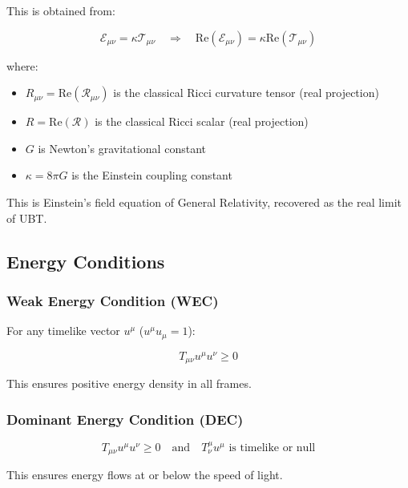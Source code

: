 This is obtained from:

\begin{equation}
\mathcal{E}_{\mu\nu} = \kappa \mathcal{T}_{\mu\nu} \quad \Rightarrow \quad \text{Re}(\mathcal{E}_{\mu\nu}) = \kappa \text{Re}(\mathcal{T}_{\mu\nu})
\end{equation}

where:
\begin{itemize}
    \item $R_{\mu\nu} = \text{Re}(\mathcal{R}_{\mu\nu})$ is the classical Ricci curvature tensor (real projection)
    \item $R = \text{Re}(\mathcal{R})$ is the classical Ricci scalar (real projection)
    \item $G$ is Newton's gravitational constant
    \item $\kappa = 8\pi G$ is the Einstein coupling constant
\end{itemize}

This is Einstein's field equation of General Relativity, recovered as the real limit of UBT.

\subsection{Energy Conditions}

\subsubsection{Weak Energy Condition (WEC)}

For any timelike vector $u^\mu$ ($u^\mu u_\mu = 1$):

\begin{equation}
\label{eq:canonical:wec}
T_{\mu\nu} u^\mu u^\nu \geq 0
\end{equation}

This ensures positive energy density in all frames.

\subsubsection{Dominant Energy Condition (DEC)}

\begin{equation}
\label{eq:canonical:dec}
T_{\mu\nu} u^\mu u^\nu \geq 0 \quad \text{and} \quad T^\mu_\nu u^\mu \text{ is timelike or null}
\end{equation}

This ensures energy flows at or below the speed of light.

